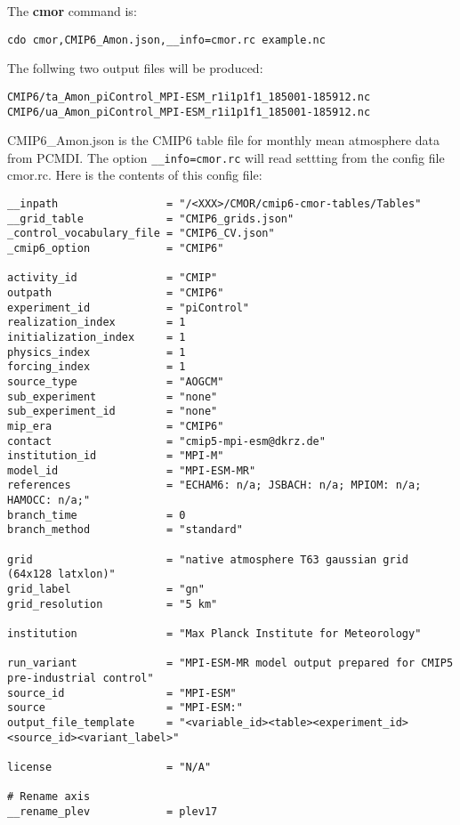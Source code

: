 The {\CDO} \textbf{cmor} command is:
\begin{lstlisting}[frame=single, backgroundcolor=\color{pcolor1}, basicstyle=\footnotesize]
   cdo cmor,CMIP6_Amon.json,__info=cmor.rc example.nc
\end{lstlisting}
The follwing two output files will be produced:
\begin{lstlisting}[frame=single, backgroundcolor=\color{pcolor1}, basicstyle=\footnotesize]
CMIP6/ta_Amon_piControl_MPI-ESM_r1i1p1f1_185001-185912.nc
CMIP6/ua_Amon_piControl_MPI-ESM_r1i1p1f1_185001-185912.nc
\end{lstlisting}
CMIP6\_Amon.json is the CMIP6 table file for monthly mean atmosphere
data from PCMDI. The option \texttt{\_\_info=cmor.rc} will read settting from
the config file cmor.rc.
Here is the contents of this config file:
\begin{lstlisting}[frame=single, backgroundcolor=\color{pcolor1},  basicstyle=\footnotesize]
__inpath                 = "/<XXX>/CMOR/cmip6-cmor-tables/Tables"
__grid_table             = "CMIP6_grids.json"
_control_vocabulary_file = "CMIP6_CV.json"
_cmip6_option            = "CMIP6"

activity_id              = "CMIP"
outpath                  = "CMIP6"
experiment_id            = "piControl"
realization_index        = 1
initialization_index     = 1
physics_index            = 1
forcing_index            = 1
source_type              = "AOGCM"
sub_experiment           = "none"
sub_experiment_id        = "none"
mip_era                  = "CMIP6"
contact                  = "cmip5-mpi-esm@dkrz.de"
institution_id           = "MPI-M"
model_id                 = "MPI-ESM-MR"
references               = "ECHAM6: n/a; JSBACH: n/a; MPIOM: n/a;  HAMOCC: n/a;"
branch_time              = 0
branch_method            = "standard"

grid                     = "native atmosphere T63 gaussian grid (64x128 latxlon)"
grid_label               = "gn"
grid_resolution          = "5 km"

institution              = "Max Planck Institute for Meteorology"

run_variant              = "MPI-ESM-MR model output prepared for CMIP5 pre-industrial control"
source_id                = "MPI-ESM"
source                   = "MPI-ESM:"
output_file_template     = "<variable_id><table><experiment_id><source_id><variant_label>"

license                  = "N/A"

# Rename axis
__rename_plev            = plev17
\end{lstlisting}

